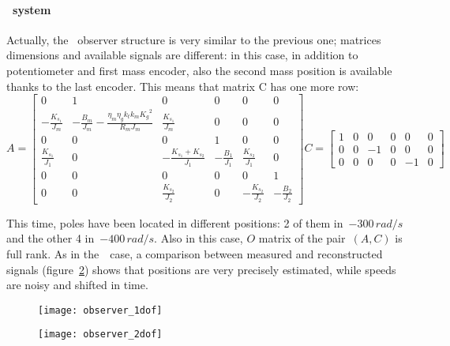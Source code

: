 \paragraph{\twodof\ system}

Actually, the \twodof\ observer structure is very similar to the previous one; matrices dimensions and available signals are different: in this case, in addition to potentiometer and first mass encoder, also the second mass position is available thanks to the last encoder. This means that matrix C has one more row:
\begin{equation}
	A = 
	\begin{bmatrix}
		0 &1 & 0 & 0 & 0 & 0 \\
		-\frac{K_{s_1}}{J_m} & -\frac{B_m}{J_m}-\frac{\eta_m \eta_g k_t k_m {K_g}^2}{R_m J_m}  & \frac{K_{s_1}}{J_m} & 0 & 0 & 0 \\
		0 & 0 & 0 & 1 & 0 & 0 \\
		\frac{K_{s_1}}{J_1} & 0 & -\frac{K_{s_1}+K_{s_2}}{J_1} & -\frac{B_1}{J_1} & \frac{K_{s_2}}{J_1} & 0 \\
		0 & 0 & 0 & 0 & 0 & 1 \\
		0 & 0 & \frac{K_{s_2}}{J_2} & 0 & -\frac{K_{s_2}}{J_2} & -\frac{B_2}{J_2}
	\end{bmatrix}
	C =
	\begin{bmatrix}
		1 & 0 & 0 & 0 & 0 & 0 \\
		0 & 0 & -1 & 0 & 0 & 0  \\
		0 & 0 & 0 & 0 & -1 & 0
	\end{bmatrix}
\label{eqn:2dof_mat_obs}
\end{equation}

This time, poles have been located in different positions: 2 of them in~$-300 \, rad/s$ and the other 4 in~$-400 \, rad/s$. Also in this case, $\mathit{O}$ matrix of the pair~$(A,C)$ is full rank. As in the~\onedof\ case, a comparison between measured and reconstructed signals (figure~\ref{fig:observer_2dof}) shows that positions are very precisely estimated, while speeds are noisy and shifted in time.

\begin{figure*}
	\centering
	\begin{subfigure}{0.45\columnwidth}
		\texttt{[image: observer\_1dof]}
		\label{fig:observer_1dof}
	\end{subfigure}
	\begin{subfigure}{0.45\columnwidth}
		\texttt{[image: observer\_2dof]}
		\label{fig:observer_2dof}
	\end{subfigure}
	\caption{Observer reconstruction compared to available measurements}
\end{figure*}

